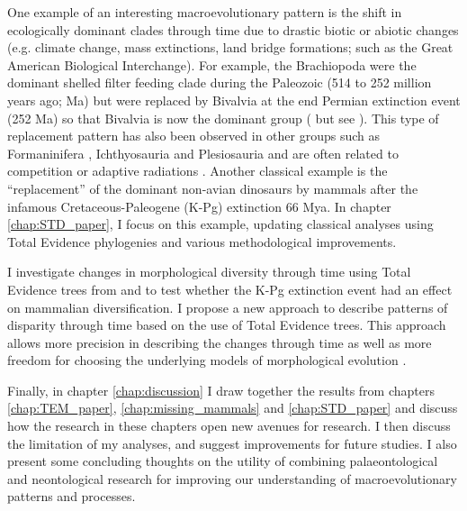 One example of an interesting macroevolutionary pattern is the shift in ecologically dominant clades through time due to drastic biotic or abiotic changes (e.g. climate change, mass extinctions, land bridge formations; such as the Great American Biological Interchange).
For example, the Brachiopoda were the dominant shelled filter feeding clade during the Paleozoic (514 to 252 million years ago; Ma) but were replaced by Bivalvia at the end Permian extinction event (252 Ma) so that Bivalvia is now the dominant group (\citealt{Sepkiski1981,CLAPHAM01102006,Liow2015} but see \citealt{Payne22052014}).
This type of replacement pattern has also been observed in other groups such as Formaninifera \citep{Coxall01042006}, Ichthyosauria \citep{thorneresetting2011} and Plesiosauria \citep{bensonfaunal2014} and are often related to competition \citep{brusatte50} or adaptive radiations \citep{Losos2010}.
Another classical example is the ``replacement'' of the dominant non-avian dinosaurs by mammals after the infamous Cretaceous-Paleogene (K-Pg) extinction 66 Mya.
In chapter \ref{chap:STD_paper}, I focus on this example, updating classical analyses using Total Evidence phylogenies and various methodological improvements.

I investigate changes in morphological diversity \citep[or disparity;][]{Wills1994} through time using Total Evidence trees from \cite{slaterphylogenetic2013} and \cite{beckancient2014} to test whether the K-Pg extinction event had an effect on mammalian diversification.
I propose a new approach to describe patterns of disparity through time based on the use of Total Evidence trees.
This approach allows more precision in describing the changes through time as well as more freedom for choosing the underlying models of morphological evolution \citep[e.g. punctuated or gradual;][]{Hunt21042015}.

Finally, in chapter \ref{chap:discussion} I draw together the results from chapters \ref{chap:TEM_paper}, \ref{chap:missing_mammals} and \ref{chap:STD_paper} and discuss how the research in these chapters open new avenues for research.
I then discuss the limitation of my analyses, and suggest improvements for future studies.
I also present some concluding thoughts on the utility of combining palaeontological and neontological research for improving our understanding of macroevolutionary patterns and processes.

%